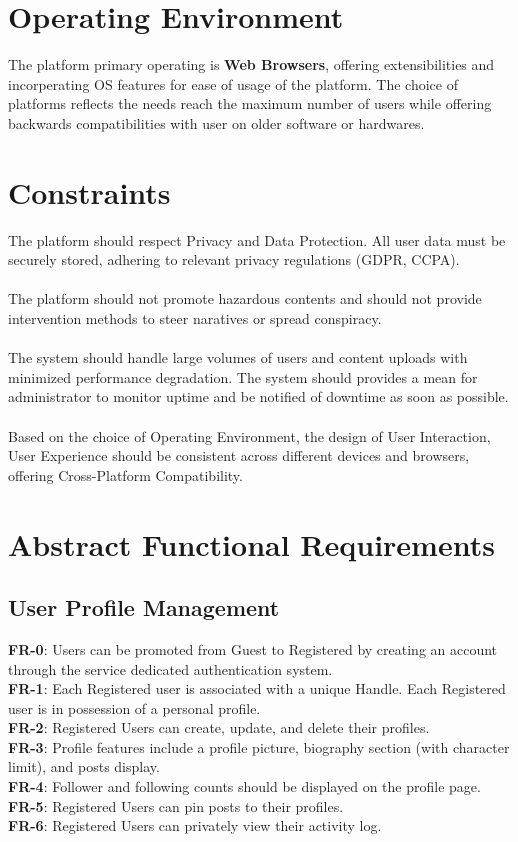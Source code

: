     \section{Operating Environment}
    The platform primary operating is \textbf{Web Browsers}, offering extensibilities and incorperating OS features for ease of usage of the platform.
    The choice of platforms reflects the needs reach the maximum number of users while offering backwards compatibilities with user on older software or hardwares.

    \section{Constraints}
    The platform should respect Privacy and Data Protection. All user data must be securely stored, adhering to relevant privacy regulations (GDPR, CCPA).
    \\\\
    The platform should not promote hazardous contents and should not provide intervention methods to steer naratives or spread conspiracy.
    \\\\
    The system should handle large volumes of users and content uploads with minimized performance degradation. The system should provides a mean for administrator to monitor uptime and be notified
    of downtime as soon as possible.
    \\\\
    Based on the choice of Operating Environment, the design of User Interaction, User Experience should be consistent across different devices and browsers, offering Cross-Platform Compatibility.

    \section{Abstract Functional Requirements}
        \subsection{User Profile Management}
        \textbf{FR-0}: Users can be promoted from Guest to Registered by creating an account through the service dedicated authentication system.
        \\
        \textbf{FR-1}: Each Registered user is associated with a unique Handle. Each Registered user is in possession of a personal profile.
        \\
        \textbf{FR-2}: Registered Users can create, update, and delete their profiles.
        \\
        \textbf{FR-3}: Profile features include a profile picture, biography section (with character limit), and posts display.
        \\
        \textbf{FR-4}: Follower and following counts should be displayed on the profile page.
        \\
        \textbf{FR-5}: Registered Users can pin posts to their profiles.
        \\
        \textbf{FR-6}: Registered Users can privately view their activity log.

